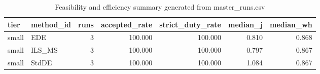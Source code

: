 \begin{table}[!t]
\centering
\caption{Feasibility and efficiency summary generated from master_runs.csv}
\label{tab:feasibility_summary_generated}
\begin{tabular}{llrrrrr}
\toprule
tier & method_id & runs & accepted_rate & strict_duty_rate & median_j & median_wh \\
\midrule
small & EDE & 3 & 100.000 & 100.000 & 0.810 & 0.868 \\
small & ILS_MS & 3 & 100.000 & 100.000 & 0.797 & 0.867 \\
small & StdDE & 3 & 100.000 & 100.000 & 1.084 & 0.867 \\
\bottomrule
\end{tabular}

\end{table}